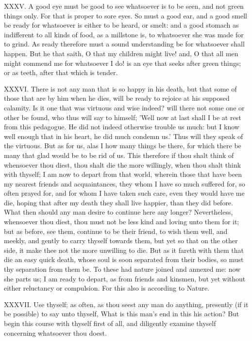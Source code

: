 XXXV. A good eye must be good to see whatsoever is to be seen, and not
green things only. For that is proper to sore eyes. So must a good ear,
and a good smell be ready for whatsoever is either to be heard, or smelt:
and a good stomach as indifferent to all kinds of food, as a millstone is,
to whatsoever she was made for to grind. As ready therefore must a sound
understanding be for whatsoever shall happen. But he that saith, O that my
children might live! and, O that all men might commend me for whatsoever I
do! is an eye that seeks after green things; or as teeth, after that which
is tender.

XXXVI. There is not any man that is so happy in his death, but that some
of those that are by him when he dies, will be ready to rejoice at his
supposed calamity. Is it one that was virtuous and wise indeed? will there
not some one or other be found, who thus will say to himself; 'Well now at
last shall I be at rest from this pedagogue. He did not indeed otherwise
trouble us much: but I know well enough that in his heart, he did much
condemn us.' Thus will they speak of the virtuous. But as for us, alas I
how many things be there, for which there be many that glad would be to be
rid of us. This therefore if thou shalt think of whensoever thou diest,
thou shalt die the more willingly, when thou shalt think with thyself; I
am now to depart from that world, wherein those that have been my nearest
friends and acquaintances, they whom I have so much suffered for, so often
prayed for, and for whom I have taken such care, even they would have me
die, hoping that after my death they shall live happier, than they did
before. What then should any man desire to continue here any longer?
Nevertheless, whensoever thou diest, thou must not be less kind and loving
unto them for it; but as before, see them, continue to be their friend, to
wish them well, and meekly, and gently to carry thyself towards them, but
yet so that on the other side, it make thee not the more unwilling to die.
But as it fareth with them that die an easy quick death, whose soul is
soon separated from their bodies, so must thy separation from them be. To
these had nature joined and annexed me: now she parts us; I am ready to
depart, as from friends and kinsmen, but yet without either reluctancy or
compulsion. For this also is according to Nature.

XXXVII. Use thyself; as often, as thou seest any man do anything,
presently (if it be possible) to say unto thyself, What is this man's end
in this his action? But begin this course with thyself first of all, and
diligently examine thyself concerning whatsoever thou doest.

